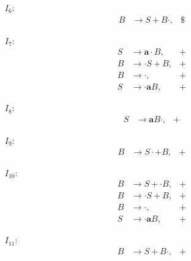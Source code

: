 \documentclass{CompilerAssignment}
\newcommand{\mbfa}{\mathbf{a}}
\begin{document}
\begin{enumerate}
\begin{multicols}{4}
\begin{enumerate}
            \item[$I_6$:]
            \[
                \begin{aligned}
                    B & \rightarrow S + B \cdot,&\$
                \end{aligned}
            \]

            \item[$I_7$:]
            \[
                \begin{aligned}
                    S & \rightarrow \mbfa \cdot B,&+ \\
                    B & \rightarrow \cdot S + B,&+ \\
                    B & \rightarrow \cdot,&+ \\
                    S & \rightarrow \cdot \mbfa B,&+
                \end{aligned}
            \]

            \item[$I_8$:]
            \[
                \begin{aligned}
                    S & \rightarrow \mbfa B \cdot,&+
                \end{aligned}
            \]

            \item[$I_9$:]
            \[
                \begin{aligned}
                    B & \rightarrow S \cdot + B,&+
                \end{aligned}
            \]

            \item[$I_{10}$:]
            \[
                \begin{aligned}
                    B & \rightarrow S + \cdot B,&+ \\
                    B & \rightarrow \cdot S + B,&+ \\
                    B & \rightarrow \cdot,&+ \\
                    S & \rightarrow \cdot \mbfa B,&+
                \end{aligned}
            \]

            \item[$I_{11}$:]
            \[
                \begin{aligned}
                    B & \rightarrow S + B \cdot,&+
                \end{aligned}
            \]
        \end{enumerate}
    \end{multicols}


\end{enumerate}
\end{document}
